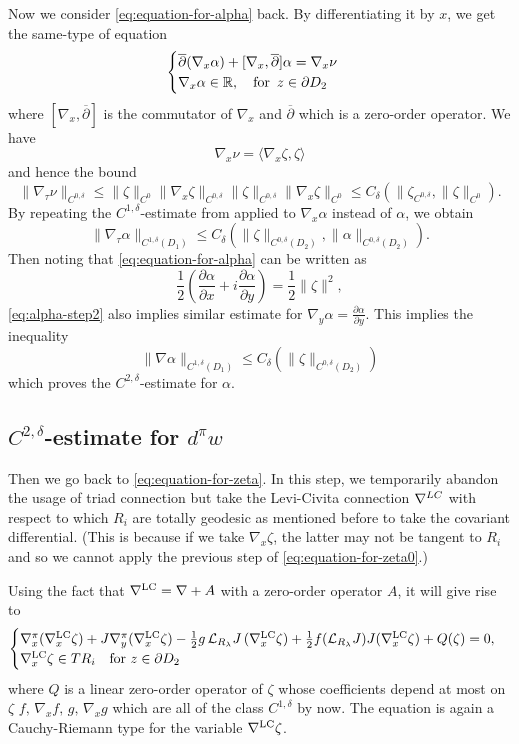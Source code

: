 \documentclass[reqno]{amsart}
\def\R{\ifmmode{\mathbb R}\else{$\mathbb R$}\fi} %
\newcommand{\del}{\partial}
\newcommand{\be}{\begin{equation}}
\newcommand{\ee}{\end{equation}}
\theoremstyle{theorem}
\theoremstyle{definition}
\numberwithin{equation}{section}
\def\R{{\mathbb R}}
\def\R{{\mathbb R}}
\def\delbar{{\overline \partial}}
\def\R{\ifmmode{\mathbb R}\else{$\mathbb R$}\fi} %
\def\R{{\mathbb R}}
\def\R{{\mathbb R}}
\def\delbar{{\overline \partial}}
\def\CL{{\mathcal L}}
\begin{document}
Now we consider \eqref{eq:equation-for-alpha} back.
By differentiating it by $x$, we get the same-type of equation
$$
\begin{cases}
\delbar (\nabla_x \alpha) + [\nabla_x,\delbar] \alpha = \nabla_x \nu \\
\nabla_x \alpha \in \R, \quad \text{\rm for }\,  z \in \del D_2
\end{cases}
$$
where $[\nabla_x,\delbar]$ is the commutator of $\nabla_x$ and $\delbar$ which is
a zero-order operator.
We have
$$
\nabla_x \nu = \langle \nabla_x \zeta, \zeta \rangle
$$
and hence the bound
$$
\|\nabla_\tau \nu\|_{C^{0,\delta}} \leq \|\zeta\|_{C^0} \|\nabla_x  \zeta\|_{C^{0,\delta}}
\|\zeta\|_{C^{0,\delta}} \|\nabla_x  \zeta\|_{C^0} \leq
C_\delta(\|\zeta_{C^{0,\delta}}, \|\zeta\|_{C^0}).
$$
By repeating the $C^{1,\delta}$-estimate from \cite[Proposition 2.3.6 (ii)]{sikorav:holo}
applied to $\nabla_x \alpha$ instead of $\alpha$, we obtain
\be\label{eq:alpha-step2}
\|\nabla_\tau \alpha \|_{C^{1,\delta}(D_1)}\leq C_\delta( \|\zeta \|_{C^{0,\delta}(D_2)},
\|\alpha\|_{C^{0,\delta}(D_2)}).
\ee
Then noting that \eqref{eq:equation-for-alpha} can be written as
$$
\frac12 \left( \frac{\del \alpha}{\del x} + i \frac{\del \alpha}{\del y}\right) = \frac12 \|\zeta\|^2,
$$
\eqref{eq:alpha-step2} also implies similar estimate for $\nabla_y \alpha = \frac{\del \alpha}{\del y}$.
This implies the inequality
$$
\|\nabla \alpha\|_{C^{1,\delta}(D_1)}\leq C_\delta( \|\zeta \|_{C^{0,\delta}(D_2)})
$$
which proves the $C^{2,\delta}$-estimate for $\alpha$.

\subsection{$C^{2,\delta}$-estimate for $d^\pi w$}

Then we go back to \eqref{eq:equation-for-zeta}.
In this step, we temporarily abandon the usage of triad connection but take
the Levi-Civita connection $\nabla^{\text \rm{LC}}$
with respect to which $R_i$ are totally geodesic as mentioned before
to take the covariant differential. (This is because if we take $\nabla_x\zeta$, the latter
may not be tangent to $R_i$ and so we cannot apply the previous step of \eqref{eq:equation-for-zeta0}.)

Using the fact that $\nabla^{\text{\rm LC}} = \nabla + A$ with a zero-order operator
$A$,  it will give rise to
\be\label{eq:equation-for-zeta}
\begin{cases}
\nabla_x^\pi (\nabla_x^{\text{\rm LC}} \zeta)
+ J \nabla_y^\pi  (\nabla_x^{\text{\rm LC}} \zeta)
- \frac12  g\, \CL_{R_\lambda}J \, (\nabla_x^{\text{\rm LC}} \zeta) + \frac12 f (\CL_{R_\lambda}J) J (\nabla_x^{\text{\rm LC}} \zeta)
+ Q(\zeta)= 0,\\
\nabla_x^{\text{\rm LC}} \zeta \in TR_i \quad \text{\rm for } z \in \del D_2
\end{cases}
\ee
where $Q$ is a linear zero-order operator of $\zeta$ whose coefficients
depend at most on $\zeta\, \, f, \, \nabla_x f, \, g, \, \nabla_x g$ which are all
of the class $C^{1,\delta}$ by now. The equation is again a Cauchy-Riemann type
for the variable $\nabla^{\text{\rm LC}}\zeta$.
\end{document}
